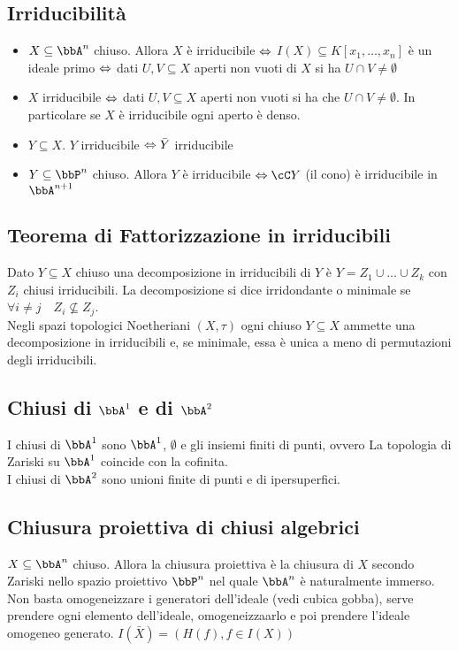 \documentclass[a4paper,NoNotes,GeneralMath]{stdmdoc}
\begin{document}
	\subsection*{Irriducibilità}
	\begin{itemize}
		\item $X \subseteq \bbA^n$ chiuso. Allora $X$ è irriducibile $\Leftrightarrow$ $I(X) \subseteq K[x_1, \ldots, x_n]$ è un ideale primo $\Leftrightarrow$ dati $U, V \subseteq X$ aperti non vuoti di $X$ si ha $U \cap V \neq \emptyset$
		\item $X$ irriducibile $\Leftrightarrow$ dati $U, V \subseteq X$ aperti non vuoti si ha che $U \cap V \neq \emptyset$. In particolare se $X$ è irriducibile ogni aperto è denso.
		\item $Y \subseteq X$. $Y$ irriducibile $\Leftrightarrow \bar{Y}$ irriducibile
		\item $Y \subseteq \bbP^n$ chiuso. Allora $Y$ è irriducibile $\sse \cC Y$ (il cono) è irriducibile in $\bbA^{n+1}$
	\end{itemize}
	
	\subsection*{Teorema di Fattorizzazione in irriducibili}
	Dato $Y \subseteq X$ chiuso una decomposizione in irriducibili di $Y$ è $Y = Z_1 \cup \ldots \cup Z_k$ con $Z_i$ chiusi irriducibili. La decomposizione si dice irridondante o minimale se $\forall i \neq j \quad Z_i \not\subseteq Z_j$. \\
	Negli spazi topologici Noetheriani $(X, \tau)$ ogni chiuso $Y \subseteq X$ ammette una decomposizione in irriducibili e, se minimale, essa è unica a meno di permutazioni degli irriducibili.
	
	\subsection*{Chiusi di $\bbA^1$ e di $\bbA^2$}
	I chiusi di $\bbA^1$ sono $\bbA^1$, $\emptyset$ e gli insiemi finiti di punti, ovvero La topologia di Zariski su $\bbA^1$ coincide con la cofinita. \\
	I chiusi di $\bbA^2$ sono unioni finite di punti e di ipersuperfici.
	
	\subsection*{Chiusura proiettiva di chiusi algebrici}
	$X \subseteq \bbA^n$ chiuso. Allora la chiusura proiettiva è la chiusura di $X$ secondo Zariski nello spazio proiettivo $\bbP^n$ nel quale $\bbA^n$ è naturalmente immerso. Non basta omogeneizzare i generatori dell'ideale (vedi cubica gobba), serve prendere ogni elemento dell'ideale, omogeneizzaarlo e poi prendere l'ideale omogeneo generato. $I(\bar{X}) = (H(f), f \in I(X))$
	
\end{document}

